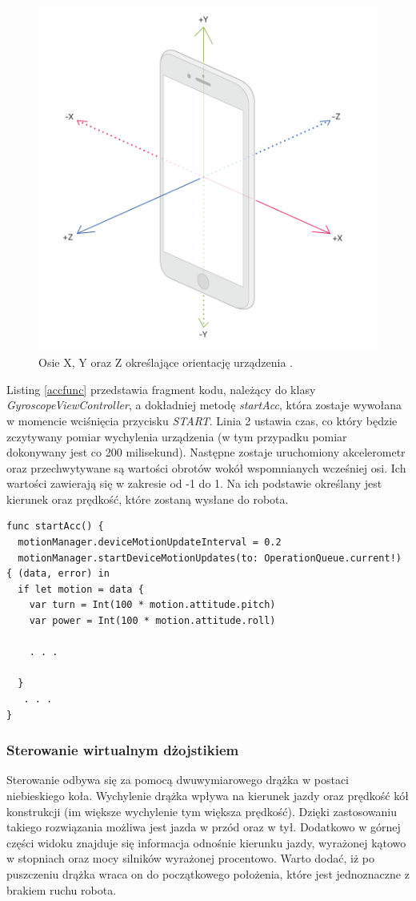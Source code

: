 \begin{figure}[H]
	\centering
		\includegraphics[width=0.6\linewidth]{pic05/axis}
	\caption{Osie X, Y oraz Z określające orientację urządzenia \cite{Axis}.}
	\label{fig:axis}	
\end{figure}

Listing \ref{accfunc} przedstawia fragment kodu, należący do klasy \textit{GyroscopeViewController}, a dokładniej metodę \textit{startAcc}, która zostaje wywołana w momencie wciśnięcia przycisku \textit{START}. Linia 2 ustawia czas, co który będzie zczytywany pomiar wychylenia urządzenia (w tym przypadku pomiar dokonywany jest co 200 milisekund). Następne zostaje uruchomiony akcelerometr oraz przechwytywane są wartości obrotów wokół wspomnianych wcześniej osi. Ich wartości zawierają się w zakresie od -1 do 1. Na ich podstawie określany jest kierunek oraz prędkość, które zostaną wysłane do robota.

\begin{minipage}{\textwidth}
	\begin{lstlisting}[label=accfunc,caption=Implementacja metody startAcc.]
func startAcc() {
  motionManager.deviceMotionUpdateInterval = 0.2
  motionManager.startDeviceMotionUpdates(to: OperationQueue.current!) { (data, error) in
  if let motion = data {
    var turn = Int(100 * motion.attitude.pitch)
    var power = Int(100 * motion.attitude.roll)
    
    . . . 

  }
   . . . 
}
	\end{lstlisting}
\end{minipage}

\subsubsection{Sterowanie wirtualnym dżojstikiem}
Sterowanie odbywa się za pomocą dwuwymiarowego drążka w postaci niebieskiego koła. Wychylenie drążka wpływa na kierunek jazdy oraz prędkość kół konstrukcji (im większe wychylenie tym większa prędkość). Dzięki zastosowaniu takiego rozwiązania możliwa jest jazda w przód oraz w tył. Dodatkowo w górnej części widoku znajduje się informacja odnośnie kierunku jazdy, wyrażonej kątowo w stopniach oraz mocy silników wyrażonej procentowo. Warto dodać, iż po puszczeniu drążka wraca on do początkowego położenia, które jest jednoznaczne z brakiem ruchu robota.

